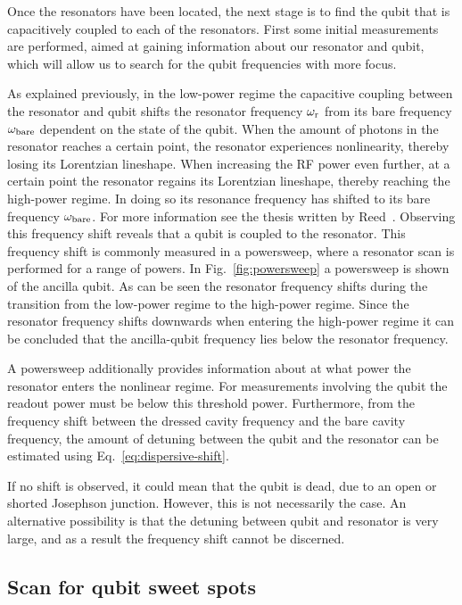         Once the resonators have been located, the next stage is to find the qubit that is capacitively coupled to each of the resonators. First some initial measurements are performed, aimed at gaining information about our resonator and qubit, which will allow us to search for the qubit frequencies with more focus.

        As explained previously, in the low-power regime the capacitive coupling between the resonator and qubit shifts the resonator frequency $\omega_\text{r}$ from its bare frequency $\omega_\text{bare}$ dependent on the state of the qubit. When the amount of photons in the resonator reaches a certain point, the resonator experiences nonlinearity, thereby losing its Lorentzian lineshape. When increasing the RF power even further, at a certain point the resonator regains its Lorentzian lineshape, thereby reaching the high-power regime. In doing so its resonance frequency has shifted to its bare frequency $\omega_\text{bare}$. For more information see the thesis written by Reed~\cite{Reed}. Observing this frequency shift reveals that a qubit is coupled to the resonator. This frequency shift is commonly measured in a powersweep, where a resonator scan is performed for a range of powers. In Fig.~\ref{fig:powersweep} a powersweep is shown of the ancilla qubit. As can be seen the resonator frequency shifts during the transition from the low-power regime to the high-power regime. Since the resonator frequency shifts downwards when entering the high-power regime it can be concluded that the ancilla-qubit frequency lies below the resonator frequency.

        A powersweep additionally provides information about at what power the resonator enters the nonlinear regime. For measurements involving the qubit the readout power must be below this threshold power. Furthermore, from the frequency shift between the dressed cavity frequency and the bare cavity frequency, the amount of detuning between the qubit and the resonator can be estimated using Eq.~\ref{eq:dispersive-shift}.

        If no shift is observed, it could mean that the qubit is dead, due to an open or shorted Josephson junction. However, this is not necessarily the case. An alternative possibility is that the detuning between qubit and resonator is very large, and as a result the frequency shift cannot be discerned.

      \subsection{Scan for qubit sweet spots}
        \label{Scan for qubit sweet spots}

